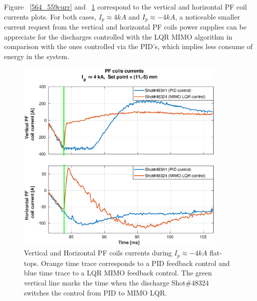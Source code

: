  Figure ~\ref{564_559curr} and ~\ref{341_342_curr} correspond to the vertical and horizontal PF coil currents plots. For both cases, $I_p\approx 4kA$ and $I_p\approx -4kA$, a noticeable smaller current  request from the vertical and horizontal PF coils power supplies can be appreciate for the discharges controlled with the LQR MIMO algorithm in comparison with the ones controlled via the PID's, which implies  less consume of energy in the system.\smallskip

 \begin{figure}[h]
 	\centering
 	\includegraphics[width=0.9\textwidth]{Chp5/PIDvsMIMO_341_324_curr_2.eps}
 	\caption{ Vertical and Horizontal PF coils currents during  $I_p\approx -4kA$  flat-tops. Orange time trace corresponds to a PID feedback control and blue time trace to a LQR MIMO feedback control. The green vertical line marks the time  when the  discharge Shot$\# 48324$ switches the control from PID to MIMO LQR. \label{341_342_curr}}
 \end{figure}
 


